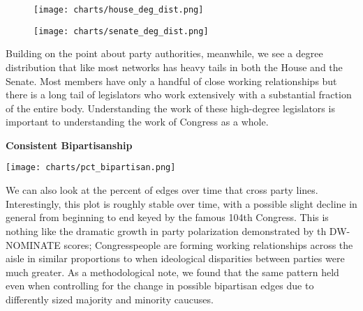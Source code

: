 \begin{figure}[htbp]
  \centering
  \begin{minipage}[h]{0.4\textwidth}
    \texttt{[image: charts/house\_deg\_dist.png]}
  \end{minipage}
  \hfill
  \begin{minipage}[h]{0.4\textwidth}
    \texttt{[image: charts/senate\_deg\_dist.png]}
  \end{minipage}
\end{figure}

Building on the point about party authorities, meanwhile, we see a degree
distribution that like most networks has heavy tails in both the House and the
Senate. Most members have only a handful of close working relationships but
there is a long tail of legislators who work extensively with a substantial
fraction of the entire body. Understanding the work of these high-degree
legislators is important to understanding the work of Congress as a whole.

\vspace{3mm}

\noindent
\textbf{Consistent Bipartisanship}

\vspace{3mm}

\texttt{[image: charts/pct\_bipartisan.png]}

We can also look at the percent of edges over time that cross party lines.
Interestingly, this plot is roughly stable over time, with a possible slight
decline in general from beginning to end keyed by the famous 104th Congress.
This is nothing like the dramatic growth in party polarization demonstrated by
th DW-NOMINATE scores; Congresspeople are forming working relationships across
the aisle in similar proportions to when ideological disparities between parties
were much greater. As a methodological note, we found that the same pattern held
even when controlling for the change in possible bipartisan edges due to
differently sized majority and minority caucuses.
